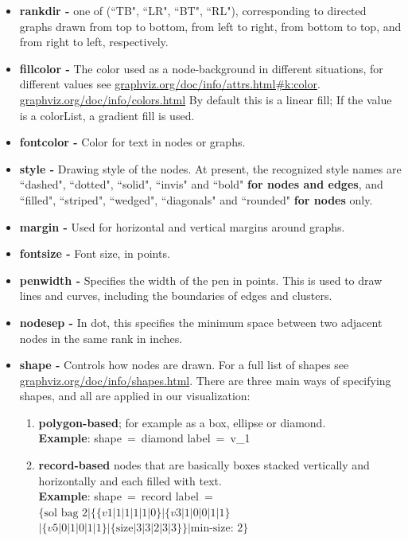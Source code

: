 \documentclass[a4paper, 12pt, bibliography=totoc]{scrartcl}
\begin{document}
\begin{itemize}
	\item \textbf{rankdir -} one of (``TB", ``LR", ``BT", ``RL"), corresponding to directed graphs drawn from top to bottom, from left to right, from bottom to top, and from right to left, respectively.
	
	\item \textbf{fillcolor -} The color used as a node-background in different situations, for different values see \url{graphviz.org/doc/info/attrs.html#k:color}. \url{graphviz.org/doc/info/colors.html} 
	By default this is a linear fill; If the value is a colorList, a gradient fill is used. 
	
	\item \textbf{fontcolor -} Color for text in nodes or graphs. 
	
	\item \textbf{style -} Drawing style of the nodes.
	At present, the recognized style names are ``dashed", ``dotted", ``solid", ``invis" and ``bold" \textbf{for nodes and edges},  and ``filled", ``striped", ``wedged", ``diagonals" and ``rounded" \textbf{for nodes} only.
	
	\item 
	\textbf{margin -} Used for horizontal and vertical margins around graphs.
	
	\item \textbf{fontsize -} Font size, in points. 
	
	\item \textbf{penwidth -} Specifies the width of the pen in points. This is used to draw lines and curves, including the boundaries of edges and clusters. 
	
	\item \textbf{nodesep -} In dot, this specifies the minimum space between two adjacent nodes in the same rank in inches. 
	
	\item \textbf{shape -} Controls how nodes are drawn. For a full list of shapes see \url{graphviz.org/doc/info/shapes.html}. There are three main ways of specifying shapes, and all are applied in our visualization: 
	\begin{enumerate}[label=(\arabic*)]
		\item \textbf{polygon-based}; for example as a box, ellipse or diamond.\vspace{10pt}\\		
		\textbf{Example}: shape~=~diamond label~=~v\_1
		
		\item \textbf{record-based} nodes that are basically boxes stacked vertically and horizontally and each filled with text.\vspace{10pt}\\
		\textbf{Example}: shape~=~record label~=~$\{\text{sol bag 2}|\{\{v1|1|1|1|1|0\}|\{v3|1|0|0|1|1\}$ \\
		\hspace*{0pt}\hfill $|\{v5|0|1|0|1|1\}|
		\{\text{size}|3|3|2|3|3\}\}|\text{min-size: 2}\}$
		

\end{enumerate}
\end{itemize}
\end{document}
